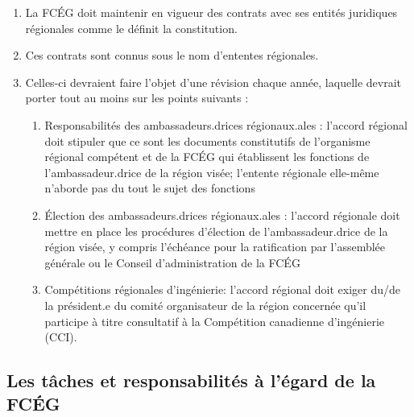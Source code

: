 \begin{enumerate}
 \item
  La FCÉG doit maintenir en vigueur des contrats avec ses entités juridiques régionales comme le définit la constitution.
 \item
  Ces contrats sont connus sous le nom d'ententes régionales.
 \item
  Celles-ci devraient faire l'objet d'une révision chaque année, laquelle devrait porter tout au moins sur les points suivants :

  \begin{enumerate}
   \item
    Responsabilités des ambassadeurs.drices régionaux.ales : l'accord régional doit stipuler que ce sont les documents constitutifs de l'organisme régional compétent et de la FCÉG qui établissent les fonctions de l'ambassadeur.drice de la région visée; l'entente régionale elle-même n'aborde pas du tout le sujet des fonctions
   \item
    Élection des ambassadeurs.drices régionaux.ales : l'accord régionale doit mettre en place les procédures d'élection de l'ambassadeur.drice de la région visée, y compris l'échéance pour la ratification par l'assemblée générale ou le Conseil d'administration de la FCÉG
   \item
    Compétitions régionales d'ingénierie: l'accord régional doit exiger du/de la président.e du comité organisateur de la région concernée qu'il participe à titre consultatif à la Compétition canadienne d'ingénierie (CCI).
  \end{enumerate}
\end{enumerate}

\subsection{Les tâches et responsabilités à l'égard de la FCÉG}
\label{les-taches-et-responsabilites-a-l-egard-de-la-fceg}


